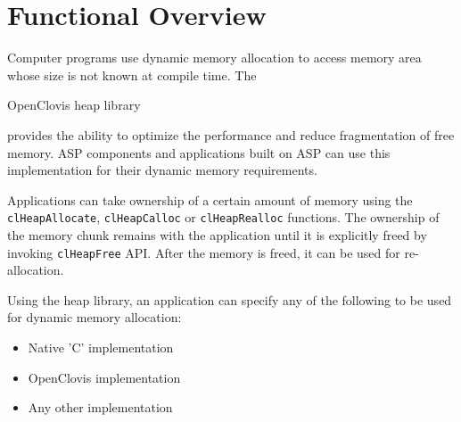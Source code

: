 \hypertarget{group__group42}{
\chapter{Functional Overview}
\label{group__group42}  }


\begin{flushleft}
Computer programs use dynamic memory
allocation to access memory area whose size
is not known at compile time. The \begin{bf}OpenClovis heap library
\end{bf} provides the ability to optimize the performance and reduce
fragmentation of free memory. ASP components and applications
built on ASP can use this implementation for their dynamic memory
requirements.
\newline
\par
Applications can take ownership of a certain amount of memory using the {\tt{clHeapAllocate}}, {\tt{clHeapCalloc}} or
{\tt{clHeapRealloc}} functions. The ownership of the memory chunk
remains with the application until it is explicitly freed by
invoking {\tt{clHeapFree}} API. After the memory is freed, it can
be used for re-allocation.
\newline
\par
Using the heap library, an application can specify any of the following to be used for dynamic memory allocation:
\begin{itemize}
\item
Native 'C' implementation
\item
OpenClovis implementation
\item
Any other implementation
\end{itemize}


\end{flushleft}
